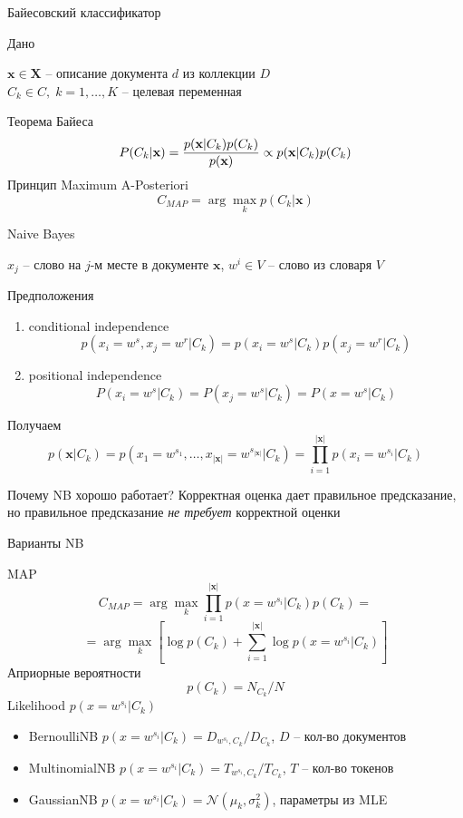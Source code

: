 \documentclass[10pt]{beamer}
\begin{document}
\begin{frame}{Байесовский классификатор}

Дано

$\mathbf{x} \in \mathbf{X}$ -- описание документа $d$ из коллекции $D$ \\
$C_k \in C, \; k = 1,\ldots,K$ -- целевая переменная

\vspace{1em}
Теорема Байеса
\[
P(C_k | \textbf{x}) = \frac{p(\textbf{x} | C_k) p(C_k)}{p(\textbf x)} \propto p(\textbf{x} | C_k) p(C_k)
\]
Принцип Maximum A-Posteriori
\[
C_{MAP} = \arg \max_k p(C_k | \textbf{x})
\]

\end{frame}


\begin{frame}{Naive Bayes}

$x_j$ -- слово на $j$-м месте в документе $\mathbf{x}$,
$w^i \in V$ -- слово из словаря $V$

\vspace{1em}
Предположения
\begin{enumerate}
\item conditional independence 
\[
p(x_i=w^s, x_j=w^r | C_k) = p(x_i=w^s | C_k) p(x_j=w^r | C_k)
\]
\item positional independence
\[
P(x_i=w^s | C_k) = P(x_j=w^s | C_k) = P(x = w^s | C_k)
\]
\end{enumerate}

Получаем
\[
p(\mathbf{x} | C_k) = p(x_1=w^{s_1}, \ldots, x_{|\mathbf{x}|}=w^{s_{|\mathbf{x}|}} | C_k) = \prod_{i=1}^{|\mathbf{x}|} p(x_i = w^{s_i} | C_k)
\]

\begin{block}{Почему NB хорошо работает?}
Корректная оценка дает правильное предсказание, но правильное предсказание {\it не требует} корректной оценки
\end{block}

\end{frame}


\begin{frame}{Варианты NB}

MAP
\[
C_{MAP} = \arg \max_k \prod_{i=1}^{|\mathbf{x}|} p(x = w^{s_i} | C_k) p(C_k) = 
\]
\[
= \arg \max_k \left[ \log p(C_k) + \sum_{i=1}^{|\mathbf{x}|} \log p(x = w^{s_i} | C_k) \right]
\]
Априорные вероятности
\[
p(C_k) = N_{C_k}/{N}
\]
Likelihood $p(x = w^{s_i} | C_k)$
\begin{itemize}
\item BernoulliNB $p(x = w^{s_i} | C_k) = D_{w^{s_i}, C_k} / D_{C_k}$, $D$ -- кол-во документов
\item MultinomialNB $p(x = w^{s_i} | C_k) = T_{w^{s_i}, C_k} / T_{C_k}$, $T$ -- кол-во токенов
\item GaussianNB $p(x = w^{s_i} | C_k) = \mathcal{N}(\mu_k, \sigma_k^2)$, параметры из MLE
\end{itemize}

\end{frame}
\end{document}
